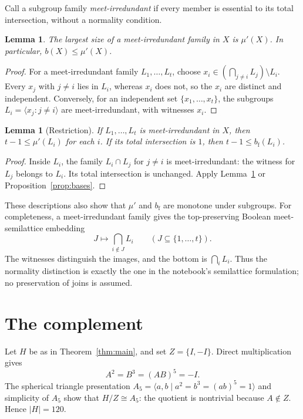 \IfFileExists{baustms.cls}{\bulletinformattrue\documentclass[plain]{baustms}}{\bulletinformatfalse\documentclass[11pt]{amsart}}
\theoremstyle{cupthm}
\newtheorem{lemma}[theorem]{Lemma}
\newcommand{\mup}{\mu'}
\newcommand{\bfth}{b_{\mathrm f}}
\begin{document}
Call a subgroup family \emph{meet-irredundant} if every member is essential
to its total intersection, without a normality condition.

\begin{lemma}\label{lem:breadth}
The largest size of a meet-irredundant family in $X$ is $\mup(X)$.
In particular, $b(X)\le\mup(X)$.
\end{lemma}
\begin{proof}
For a meet-irredundant family $L_1,\ldots,L_t$, choose
$x_i\in(\bigcap_{j\ne i}L_j)\setminus L_i$.
Every $x_j$ with $j\ne i$ lies in $L_i$, whereas $x_i$ does not, so
the $x_i$ are distinct and independent. Conversely, for an independent
set $\{x_1,\ldots,x_t\}$, the subgroups
$L_i=\langle x_j:j\ne i\rangle$ are meet-irredundant, with witnesses $x_i$.
\end{proof}

\begin{lemma}[Restriction]\label{lem:restriction}
If $L_1,\ldots,L_t$ is meet-irredundant in $X$, then
$t-1\le\mup(L_i)$ for each $i$. If its total intersection is $1$,
then $t-1\le\bfth(L_i)$.
\end{lemma}
\begin{proof}
Inside $L_i$, the family $L_i\cap L_j$ for $j\ne i$ is meet-irredundant:
the witness for $L_j$ belongs to $L_i$. Its total intersection is unchanged.
Apply Lemma~\ref{lem:breadth} or Proposition~\ref{prop:bases}.
\end{proof}

These descriptions also show that $\mup$ and $\bfth$ are monotone under
subgroups. For completeness, a meet-irredundant family gives the
top-preserving Boolean meet-semilattice embedding
\[
 J\longmapsto\bigcap_{i\notin J}L_i
 \qquad(J\subseteq\{1,\ldots,t\}).
\]
The witnesses distinguish the images, and the bottom is $\bigcap_iL_i$.
Thus the normality distinction is exactly the one in the notebook's
semilattice formulation; no preservation of joins is assumed.

\section{The complement}
Let $H$ be as in Theorem~\ref{thm:main}, and set $Z=\{I,-I\}$.
Direct multiplication gives
\begin{equation}\label{eq:triangle}
 A^2=B^3=(AB)^5=-I.
\end{equation}
The spherical triangle presentation
$A_5=\langle a,b\mid a^2=b^3=(ab)^5=1\rangle$
and simplicity of $A_5$ show that $H/Z\cong A_5$: the quotient is
nontrivial because $A\notin Z$. Hence $|H|=120$.
\end{document}
